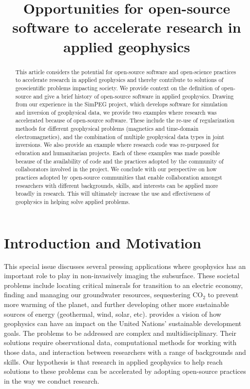 \title{Opportunities for open-source software to accelerate research in applied geophysics}

\begin{abstract}
This article considers the potential for open-source software and open-science practices to accelerate research in applied geophysics and thereby contribute to solutions of geoscientific problems impacting society. We provide context on the definition of open-source and give a brief history of open-source software in applied geophysics. Drawing from our experience in the SimPEG project, which develops software for simulation and inversion of geophysical data, we provide two examples where research was accelerated because of open-source software. These include the re-use of regularization methods for different geophysical problems (magnetics and time-domain electromagnetics), and the combination of multiple geophysical data types in joint inversions. We also provide an example where research code was re-purposed for education and humanitarian projects. Each of these examples was made possible because of the availability of code and the practices adopted by the community of collaborators involved in the project. We conclude with our perspective on how practices adopted by open-source communities that enable collaboration amongst researchers with different backgrounds, skills, and interests can be applied more broadly in research. This will ultimately increase the use and effectiveness of geophysics in helping solve applied problems.
\end{abstract}

\section{Introduction and Motivation}
This special issue discusses several pressing applications where geophysics has an important role to play in non-invasively imaging the subsurface. These societal problems include locating critical minerals for transition to an electric economy, finding and managing our groundwater resources, sequestering  CO$_2$ to prevent more warming of the planet, and further developing other more sustainable sources of energy (geothermal, wind, solar, etc). \cite{capello_presidents_2022} provides a vision of how geophysics can have an impact on the United Nations' sustainable development goals. The problems to be addressed are complex and multidisciplinary. Their solutions require observational data, computational methods for working with those data, and interaction between researchers with a range of backgrounds and skills. Our hypothesis is that research in applied geophysics to help reach solutions to these problems can be accelerated by adopting open-source practices in the way we conduct research.

